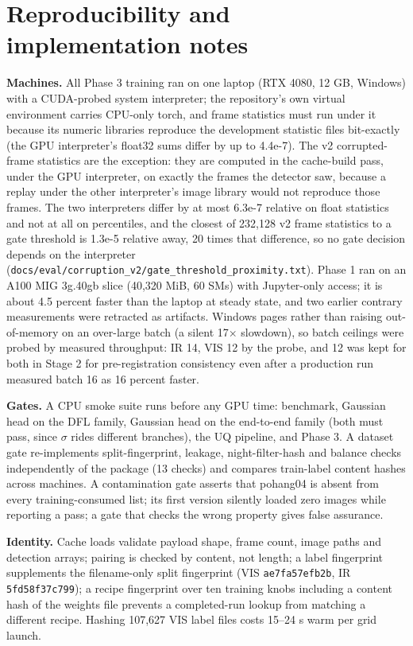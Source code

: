 \documentclass[10pt]{article}
\begin{document}
\section{Reproducibility and implementation notes}\label{app:I}
\textbf{Machines.} All Phase 3 training ran on one laptop (RTX 4080, 12 GB, Windows) with a CUDA-probed system interpreter; the repository's own virtual environment carries CPU-only torch, and frame statistics must run under it because its numeric libraries reproduce the development statistic files bit-exactly (the GPU interpreter's float32 sums differ by up to 4.4e-7). The v2 corrupted-frame statistics are the exception: they are computed in the cache-build pass, under the GPU interpreter, on exactly the frames the detector saw, because a replay under the other interpreter's image library would not reproduce those frames. The two interpreters differ by at most 6.3e-7 relative on float statistics and not at all on percentiles, and the closest of 232,128 v2 frame statistics to a gate threshold is 1.3e-5 relative away, 20 times that difference, so no gate decision depends on the interpreter (\texttt{docs/\allowbreak{}eval/\allowbreak{}corruption\_\allowbreak{}v2/\allowbreak{}gate\_\allowbreak{}threshold\_\allowbreak{}proximity.txt}). Phase 1 ran on an A100 MIG 3g.40gb slice (40,320 MiB, 60 SMs) with Jupyter-only access; it is about 4.5 percent faster than the laptop at steady state, and two earlier contrary measurements were retracted as artifacts. Windows pages rather than raising out-of-memory on an over-large batch (a silent 17$\times$ slowdown), so batch ceilings were probed by measured throughput: IR 14, VIS 12 by the probe, and 12 was kept for both in Stage 2 for pre-registration consistency even after a production run measured batch 16 as 16 percent faster.

\textbf{Gates.} A CPU smoke suite runs before any GPU time: benchmark, Gaussian head on the DFL family, Gaussian head on the end-to-end family (both must pass, since $\sigma$ rides different branches), the UQ pipeline, and Phase 3. A dataset gate re-implements split-fingerprint, leakage, night-filter-hash and balance checks independently of the package (13 checks) and compares train-label content hashes across machines. A contamination gate asserts that pohang04 is absent from every training-consumed list; its first version silently loaded zero images while reporting a pass; a gate that checks the wrong property gives false assurance.

\textbf{Identity.} Cache loads validate payload shape, frame count, image paths and detection arrays; pairing is checked by content, not length; a label fingerprint supplements the filename-only split fingerprint (VIS \texttt{ae7fa57efb2b}, IR \texttt{5fd58f37c799}); a recipe fingerprint over ten training knobs including a content hash of the weights file prevents a completed-run lookup from matching a different recipe. Hashing 107,627 VIS label files costs 15--24 s warm per grid launch.
\end{document}
